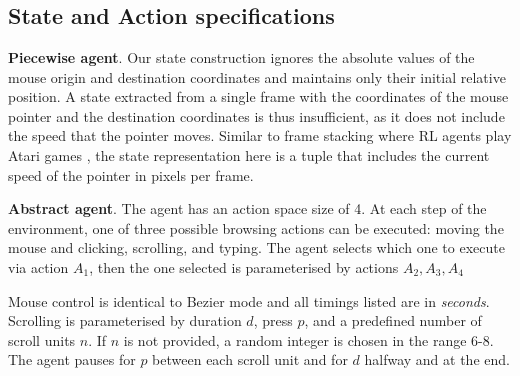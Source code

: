 
\chapter{}\label{apx:recaptcha}

\section{State and Action specifications}
\label{appendix:b}

\textbf{Piecewise agent}. Our state construction ignores the absolute values of the mouse origin and destination coordinates and maintains only their initial relative position.
A state extracted from a single frame with the coordinates of the mouse pointer and the destination coordinates is thus insufficient, as it does not include the speed that the pointer moves.
Similar to frame stacking where \gls{RL} agents play Atari games \cite{Mnih2013}, the state representation here is a tuple that includes the current speed of the pointer in pixels per frame.


\textbf{Abstract agent}. The agent has an action space size of 4.
At each step of the environment, one of three possible browsing actions can be executed: moving the mouse and clicking, scrolling, and typing.
The agent selects which one to execute via action $A_1$, then the one selected is parameterised by actions $A_2,A_3,A_4$

Mouse control is identical to Bezier mode and all timings listed are in \textit{seconds}.
Scrolling is parameterised by duration $d$, press $p$, and a predefined number of scroll units $n$.
If $n$ is not provided, a random integer is chosen in the range 6-8.
The agent pauses for $p$ between each scroll unit and for $d$ halfway and at the end.

